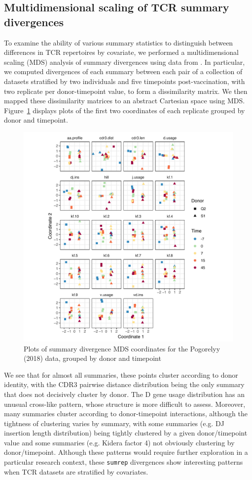 \documentclass{article}
\begin{document}
\subsection*{Multidimensional scaling of TCR summary divergences}
To examine the ability of various summary statistics to distinguish between differences in TCR repertoires by covariate, we performed a multidimensional scaling (MDS) analysis of summary divergences using data from \cite{Pogorelyy2018-ak}.
In particular, we computed divergences of each summary between each pair of a collection of datasets stratified by two individuals and five timepoints post-vaccination, with two replicate per donor-timepoint value, to form a dissimilarity matrix.
We then mapped these dissimilarity matrices to an abstract Cartesian space using MDS.
Figure~\ref{fig:TCR_MDS} displays plots of the first two coordinates of each replicate grouped by donor and timepoint.
\begin{figure}
    \includegraphics[width=\linewidth]{Figures/tcr_pca.pdf}
    \caption{Plots of summary divergence MDS coordinates for the Pogorelyy (2018) data, grouped by donor and timepoint}
    \label{fig:TCR_MDS}
\end{figure}
We see that for almost all summaries, these points cluster according to donor identity, with the CDR3 pairwise distance distribution being the only summary that does not decisively cluster by donor.
The D gene usage distribution has an unusual cross-like pattern, whose structure is more difficult to assess.
Moreover, many summaries cluster according to donor-timepoint interactions, although the tightness of clustering varies by summary, with some summaries (e.g. DJ insertion length distribution) being tightly clustered by a given donor/timepoint value and some summaries (e.g. Kidera factor 4) not obviously clustering by donor/timepoint.
Although these patterns would require further exploration in a particular research context, these \texttt{sumrep} divergences show interesting patterns when TCR datasets are stratified by covariates.
\end{document}
